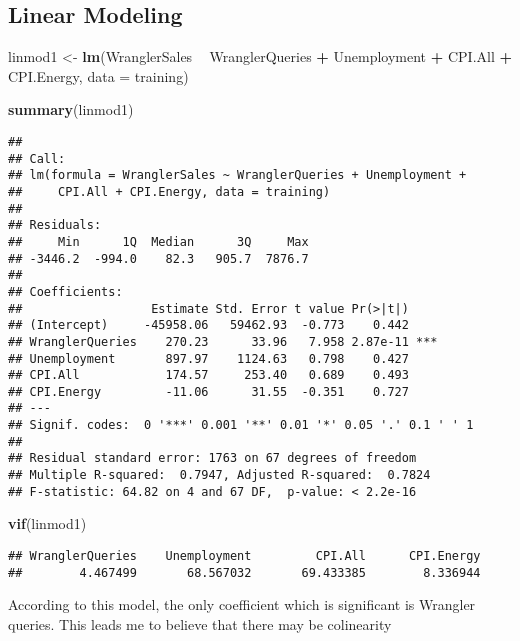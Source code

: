 \documentclass[]{article}
\newenvironment{Shaded}{\begin{snugshade}}{\end{snugshade}}
\newcommand{\KeywordTok}[1]{\textcolor[rgb]{0.13,0.29,0.53}{\textbf{#1}}}
\newcommand{\DataTypeTok}[1]{\textcolor[rgb]{0.13,0.29,0.53}{#1}}
\newcommand{\StringTok}[1]{\textcolor[rgb]{0.31,0.60,0.02}{#1}}
\newcommand{\OperatorTok}[1]{\textcolor[rgb]{0.81,0.36,0.00}{\textbf{#1}}}
\newcommand{\NormalTok}[1]{#1}
\begin{document}
\subsection{Linear Modeling}\label{linear-modeling}

\begin{Shaded}
\begin{Highlighting}[]
\NormalTok{linmod1 <-}\StringTok{ }\KeywordTok{lm}\NormalTok{(WranglerSales }\OperatorTok{~}\StringTok{ }\NormalTok{WranglerQueries }\OperatorTok{+}\StringTok{ }\NormalTok{Unemployment }\OperatorTok{+}\StringTok{ }\NormalTok{CPI.All }\OperatorTok{+}\StringTok{ }\NormalTok{CPI.Energy, }\DataTypeTok{data =}\NormalTok{ training)}

\KeywordTok{summary}\NormalTok{(linmod1)}
\end{Highlighting}
\end{Shaded}

\begin{verbatim}
## 
## Call:
## lm(formula = WranglerSales ~ WranglerQueries + Unemployment + 
##     CPI.All + CPI.Energy, data = training)
## 
## Residuals:
##     Min      1Q  Median      3Q     Max 
## -3446.2  -994.0    82.3   905.7  7876.7 
## 
## Coefficients:
##                  Estimate Std. Error t value Pr(>|t|)    
## (Intercept)     -45958.06   59462.93  -0.773    0.442    
## WranglerQueries    270.23      33.96   7.958 2.87e-11 ***
## Unemployment       897.97    1124.63   0.798    0.427    
## CPI.All            174.57     253.40   0.689    0.493    
## CPI.Energy         -11.06      31.55  -0.351    0.727    
## ---
## Signif. codes:  0 '***' 0.001 '**' 0.01 '*' 0.05 '.' 0.1 ' ' 1
## 
## Residual standard error: 1763 on 67 degrees of freedom
## Multiple R-squared:  0.7947, Adjusted R-squared:  0.7824 
## F-statistic: 64.82 on 4 and 67 DF,  p-value: < 2.2e-16
\end{verbatim}

\begin{Shaded}
\begin{Highlighting}[]
\KeywordTok{vif}\NormalTok{(linmod1)}
\end{Highlighting}
\end{Shaded}

\begin{verbatim}
## WranglerQueries    Unemployment         CPI.All      CPI.Energy 
##        4.467499       68.567032       69.433385        8.336944
\end{verbatim}

According to this model, the only coefficient which is significant is
Wrangler queries. This leads me to believe that there may be colinearity
\end{document}
